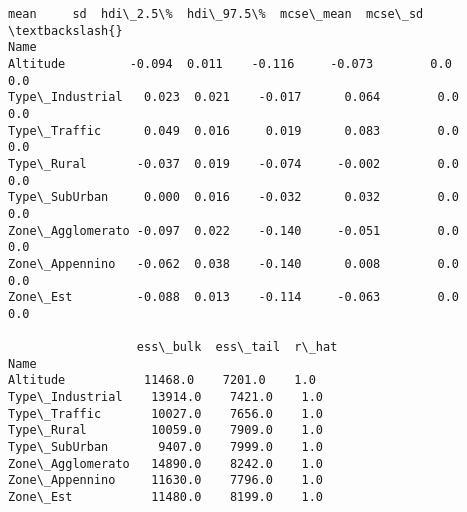 \documentclass[11pt]{article}
\makeatletter
\newcommand{\boxspacing}{\kern\kvtcb@left@rule\kern\kvtcb@boxsep}
\newcommand{\prompt}[4]{
        {\ttfamily\llap{{\color{#2}[#3]:\hspace{3pt}#4}}\vspace{-\baselineskip}}
    }
\makeatother
\begin{document}
            \begin{tcolorbox}[breakable, size=fbox, boxrule=.5pt, pad at break*=1mm, opacityfill=0]
\prompt{Out}{outcolor}{11}{\boxspacing}
\begin{Verbatim}[commandchars=\\\{\}]
                   mean     sd  hdi\_2.5\%  hdi\_97.5\%  mcse\_mean  mcse\_sd  \textbackslash{}
Name
Altitude         -0.094  0.011    -0.116     -0.073        0.0      0.0
Type\_Industrial   0.023  0.021    -0.017      0.064        0.0      0.0
Type\_Traffic      0.049  0.016     0.019      0.083        0.0      0.0
Type\_Rural       -0.037  0.019    -0.074     -0.002        0.0      0.0
Type\_SubUrban     0.000  0.016    -0.032      0.032        0.0      0.0
Zone\_Agglomerato -0.097  0.022    -0.140     -0.051        0.0      0.0
Zone\_Appennino   -0.062  0.038    -0.140      0.008        0.0      0.0
Zone\_Est         -0.088  0.013    -0.114     -0.063        0.0      0.0

                  ess\_bulk  ess\_tail  r\_hat
Name
Altitude           11468.0    7201.0    1.0
Type\_Industrial    13914.0    7421.0    1.0
Type\_Traffic       10027.0    7656.0    1.0
Type\_Rural         10059.0    7909.0    1.0
Type\_SubUrban       9407.0    7999.0    1.0
Zone\_Agglomerato   14890.0    8242.0    1.0
Zone\_Appennino     11630.0    7796.0    1.0
Zone\_Est           11480.0    8199.0    1.0
\end{Verbatim}
\end{tcolorbox}
        
\end{document}
